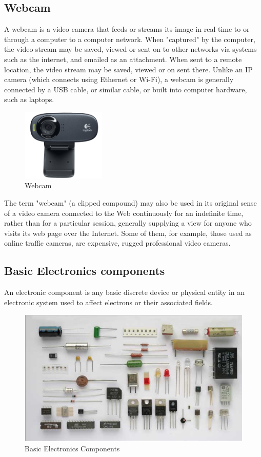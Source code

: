 \documentclass[twoside,a4paper,16pt]{book}
\begin{document}
{\subsection{Webcam }
A webcam is a video camera that feeds or streams its image in real time to or through a computer to a computer network. When "captured" by the computer, the video stream may be saved, viewed or sent on to other networks via systems such as the internet, and emailed as an attachment. When sent to a remote location, the video stream may be saved, viewed or on sent there. Unlike an IP camera (which connects using Ethernet or Wi-Fi), a webcam is generally connected by a USB cable, or similar cable, or built into computer hardware, such as laptops.
\begin{figure}[ht!]
	\begin{center}
		\includegraphics[width=4.0cm]{19.png}
		\caption{Webcam}
	\end{center}
\end{figure}

The term "webcam" (a clipped compound) may also be used in its original sense of a video camera connected to the Web continuously for an indefinite time, rather than for a particular session, generally supplying a view for anyone who visits its web page over the Internet. Some of them, for example, those used as online traffic cameras, are expensive, rugged professional video cameras.

\subsection{Basic Electronics components }
An electronic component is any basic discrete device or physical entity in an electronic system used to affect electrons or their associated fields.
\begin{figure}[ht!]
	\begin{center}
		\includegraphics[width=12.0cm]{20.jpg}
		\caption{Basic Electronics Components}
	\end{center}
\end{figure}
}
\end{document}
